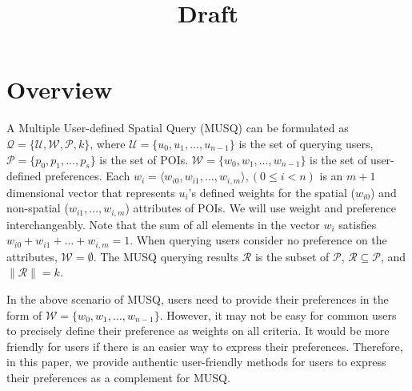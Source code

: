 \documentclass[10pt, conference, compsocconf]{IEEEtran}
\begin{document}
\title{Draft}


\maketitle



\section{Overview}\label{overview}

A Multiple User-defined Spatial Query (MUSQ) can be formulated as $\mathcal{Q} = \{\mathcal{U}, \mathcal{W}, \mathcal{P}, k\}$, where $\mathcal{U} = \{u_0, u_1, \ldots, u_{n-1}\}$ is the set of querying users, $\mathcal{P} = \{p_0, p_1, \ldots, p_s\}$ is the set of POIs. $\mathcal{W} = \{w_0, w_1, \ldots, w_{n-1}\}$ is the set of user-defined preferences. Each $w_i = \langle w_{i0}, w_{i1}, \ldots, w_{i,m} \rangle, (0 \leq i < n)$ is an $m + 1$ dimensional vector that represents $u_i$'s defined weights for the spatial ($w_{i0}$) and non-spatial ($w_{i1}, \ldots, w_{i,m}$) attributes of POIs. We will use weight and preference interchangeably. Note that the sum of all elements in the vector $w_i$ satisfies $w_{i0} + w_{i1} + \ldots + w_{i,m} = 1$. When querying users consider no preference on the attributes, $\mathcal{W} = \emptyset$. The MUSQ querying results $\mathcal{R}$ is the subset of $\mathcal{P}$, $\mathcal{R} \subseteq \mathcal{P}$, and $\|\mathcal{R}\| = k$. 

In the above scenario of MUSQ, users need to provide their preferences in the form of $\mathcal{W} = \{w_0, w_1, \ldots, w_{n-1}\}$. However, it may not be easy for common users to precisely define their preference as weights on all criteria. It would be more friendly for users if there is an easier way to express their preferences. Therefore, in this paper, we provide authentic user-friendly methods for users to express their preferences as a complement for MUSQ.
\end{document}
